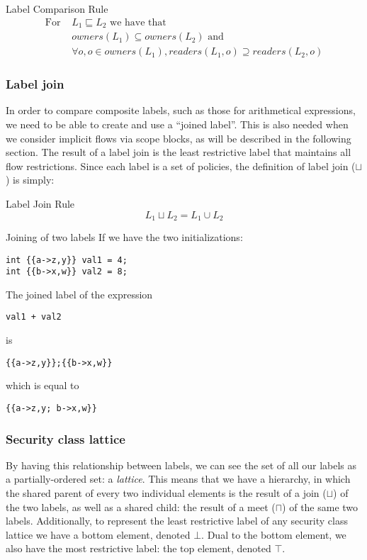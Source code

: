 \begin{definition}{Label Comparison Rule}
  \begin{align}
    \text{For } & L_1 \sqsubseteq L_2 \text{ we have that} \nonumber \\
    & owners(L_1) \subseteq owners(L_2) \text{ and} \nonumber \\
    & \forall o, o \in owners(L_1), readers(L_1, o) \supseteq readers(L_2, o) \nonumber
  \end{align}
\end{definition}

\subsubsection{Label join}
In order to compare composite labels, such as those for arithmetical expressions, we need to be able to create and use a ``joined label''.
This is also needed when we consider implicit flows via scope blocks, as will be described in the following section.
The result of a label join is the least restrictive label that maintains all flow restrictions.
Since each label is a set of policies, the definition of label join ($\sqcup$) is simply:

\begin{definition}{Label Join Rule}
  \[
    L_1 \sqcup L_2 = L_1 \cup L_2
  \]
\end{definition}

\begin{example}{Joining of two labels}
  If we have the two initializations:
  \begin{lstlisting}[style=dlmc]
int {{a->z,y}} val1 = 4;
int {{b->x,w}} val2 = 8;
  \end{lstlisting}
  The joined label of the expression\\
  \begin{lstlisting}[style=dlmc]
val1 + val2
  \end{lstlisting}
  is
  \begin{lstlisting}[style=dlmc]
{{a->z,y}};{{b->x,w}}
  \end{lstlisting}
  which is equal to
  \begin{lstlisting}[style=dlmc]
{{a->z,y; b->x,w}}
  \end{lstlisting}
\end{example}

\subsubsection{Security class lattice}
By having this relationship between labels, we can see the set of all our labels as a partially-ordered set: a \emph{lattice}.
This means that we have a hierarchy, in which the shared parent of every two individual elements is the result of a join ($\sqcup$) of the two labels, as well as a shared child: the result of a meet ($\sqcap$) of the same two labels.
Additionally, to represent the least restrictive label of any security class lattice we have a bottom element, denoted $\bot$.
Dual to the bottom element, we also have the most restrictive label: the top element, denoted $\top$.

